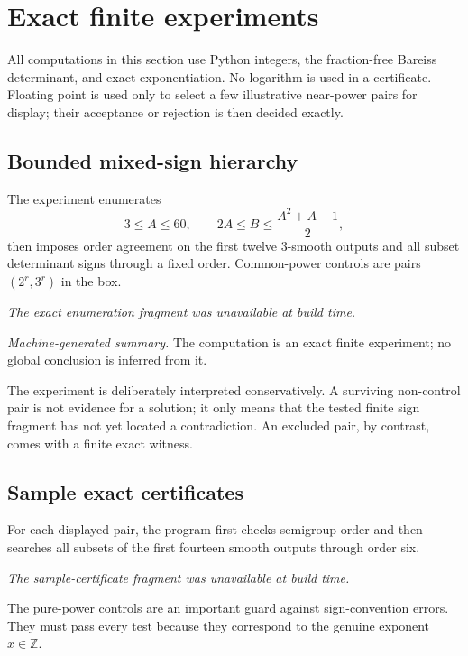 \documentclass[11pt]{article}
\theoremstyle{definition}
\theoremstyle{remark}
\newcommand{\Z}{\mathbb Z}
\begin{document}
\section{Exact finite experiments}

All computations in this section use Python integers, the fraction-free Bareiss determinant,
and exact exponentiation.  No logarithm is used in a certificate.  Floating point is used
only to select a few illustrative near-power pairs for display; their acceptance or rejection
is then decided exactly.

\subsection{Bounded mixed-sign hierarchy}

The experiment enumerates
\[
 3\le A\le60,\qquad 2A\le B\le\frac{A^2+A-1}{2},
\]
then imposes order agreement on the first twelve $3$-smooth outputs and all subset determinant
signs through a fixed order.  Common-power controls are pairs $(2^r,3^r)$ in the box.

\begin{center}
\emph{The exact enumeration fragment was unavailable at build time.}
\end{center}

\noindent\textit{Machine-generated summary.} The computation is an exact finite experiment; no global conclusion is inferred from it.

The experiment is deliberately interpreted conservatively.  A surviving non-control pair is
not evidence for a solution; it only means that the tested finite sign fragment has not yet
located a contradiction.  An excluded pair, by contrast, comes with a finite exact witness.

\subsection{Sample exact certificates}

For each displayed pair, the program first checks semigroup order and then searches all
subsets of the first fourteen smooth outputs through order six.

\begin{center}
\emph{The sample-certificate fragment was unavailable at build time.}
\end{center}

The pure-power controls are an important guard against sign-convention errors.  They must pass
every test because they correspond to the genuine exponent $x\in\Z$.
\end{document}
